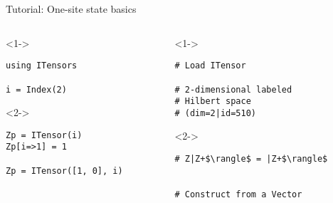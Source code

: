 \begin{frame}[fragile]{Tutorial: One-site state basics}

\begin{columns}

\begin{column}{4.5cm}

\begin{onlyenv}<1->

\begin{lstlisting}[language=JuliaLocal, style=julia, basicstyle=\small]
using ITensors

i = Index(2)

 \end{lstlisting}

\end{onlyenv}

\begin{onlyenv}<2->

\begin{lstlisting}[language=JuliaLocal, style=julia, basicstyle=\small]
Zp = ITensor(i)
Zp[i=>1] = 1

Zp = ITensor([1, 0], i)
\end{lstlisting}

\end{onlyenv}

\end{column}

\begin{column}{4.5cm}

\begin{onlyenv}<1->

\begin{lstlisting}[style=julia, numbers=none, mathescape, basicstyle=\small]
# Load ITensor

# 2-dimensional labeled
# Hilbert space
# (dim=2|id=510)
\end{lstlisting}

\end{onlyenv}

\begin{onlyenv}<2->

\begin{lstlisting}[style=julia, numbers=none, mathescape, basicstyle=\small]
# Z|Z+$\rangle$ = |Z+$\rangle$


# Construct from a Vector
\end{lstlisting}

\end{onlyenv}

\end{column}

\end{columns}

\end{frame}
